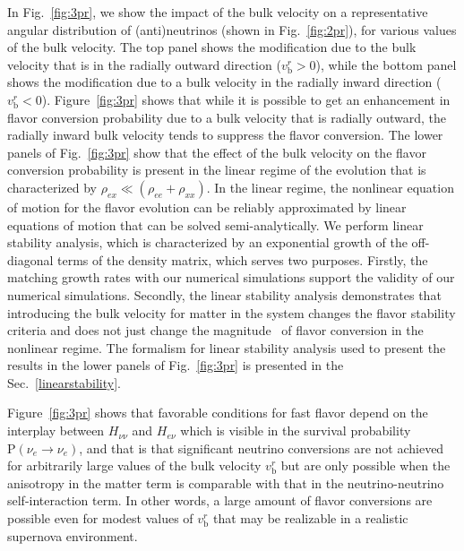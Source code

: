 \documentclass[aps, prd, 10pt, twocolumn, superscriptaddress, noshowpacs, preprintnumbers, longbibliography, groupedaddress, footinbib, bibnotes]{revtex4-1}
\newcommand{\vbr}{v_{\mathrm{b}}^{r}}
\begin{document}
In Fig.~\ref{fig:3pr}, we show the impact of the bulk velocity on a representative angular distribution of (anti)neutrinos (shown in Fig.~\ref{fig:2pr}), for various values of the bulk velocity. The top panel shows the modification due to the bulk velocity that is in the radially outward direction ($\vbr>0$), while the bottom panel shows the modification due to a bulk velocity in the radially inward direction ($\vbr<0$). Figure~\ref{fig:3pr} shows that while it is possible to get an enhancement in flavor conversion probability due to a bulk velocity that is radially outward, the radially inward bulk velocity tends to suppress the flavor conversion. The lower panels of Fig.~\ref{fig:3pr} show that the effect of the bulk velocity on the flavor conversion probability is present in the linear regime of the evolution that is characterized by $\rho_{ex} \ll (\rho_{ee}+\rho_{xx})$. In the linear regime, the nonlinear equation of motion for the flavor evolution can be reliably approximated by linear equations of motion that can be solved semi-analytically. We perform linear stability analysis, which is characterized by an exponential growth of the off-diagonal terms of the density matrix, which serves two purposes. Firstly, the matching growth rates with our numerical simulations support the validity of our numerical simulations. Secondly, the linear stability analysis demonstrates that introducing the bulk velocity for matter in the system changes the flavor stability criteria and does not just change the magnitude \ of flavor conversion in the nonlinear regime. The formalism for linear stability analysis used to present the results in the lower panels of Fig.~\ref{fig:3pr} is presented in the Sec.~\ref{linearstability}. 

Figure~\ref{fig:3pr} shows that favorable conditions for fast flavor depend on the interplay between $H_{\nu\nu}$ and $H_{e\nu}$ which is visible in the survival probability $\mathrm{P}(\nu_{e}\rightarrow \nu_{e})$, and that is that significant neutrino conversions are not achieved for arbitrarily large values of the bulk velocity $\vbr$ but are only possible when the anisotropy in the matter term is comparable with that in the neutrino-neutrino self-interaction term. In other words, a large amount of flavor conversions are possible even for modest values of $\vbr$ that may be realizable in a realistic supernova environment.


\end{document}
